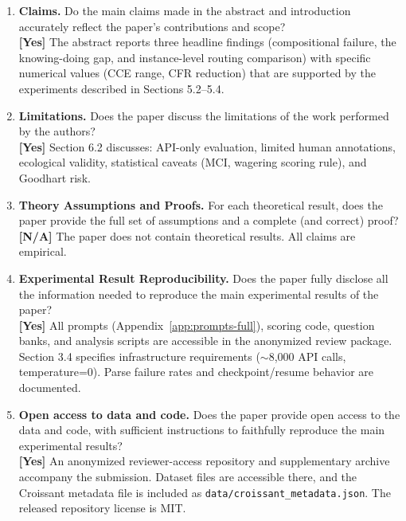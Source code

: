\documentclass[10pt]{article}
\begin{document}
\begin{enumerate}

\item \textbf{Claims.} Do the main claims made in the abstract and introduction accurately reflect the paper's contributions and scope?
\\\textbf{[Yes]} The abstract reports three headline findings (compositional failure, the knowing-doing gap, and instance-level routing comparison) with specific numerical values (CCE range, CFR reduction) that are supported by the experiments described in Sections 5.2--5.4.

\item \textbf{Limitations.} Does the paper discuss the limitations of the work performed by the authors?
\\\textbf{[Yes]} Section 6.2 discusses: API-only evaluation, limited human annotations, ecological validity, statistical caveats (MCI, wagering scoring rule), and Goodhart risk.

\item \textbf{Theory Assumptions and Proofs.} For each theoretical result, does the paper provide the full set of assumptions and a complete (and correct) proof?
\\\textbf{[N/A]} The paper does not contain theoretical results. All claims are empirical.

\item \textbf{Experimental Result Reproducibility.} Does the paper fully disclose all the information needed to reproduce the main experimental results of the paper?
\\\textbf{[Yes]} All prompts (Appendix~\ref{app:prompts-full}), scoring code, question banks, and analysis scripts are accessible in the anonymized review package. Section 3.4 specifies infrastructure requirements ($\sim$8{,}000 API calls, temperature=0). Parse failure rates and checkpoint/resume behavior are documented.

\item \textbf{Open access to data and code.} Does the paper provide open access to the data and code, with sufficient instructions to faithfully reproduce the main experimental results?
\\\textbf{[Yes]} An anonymized reviewer-access repository and supplementary archive accompany the submission. Dataset files are accessible there, and the Croissant metadata file is included as \texttt{data/croissant\_metadata.json}. The released repository license is MIT.


\end{enumerate}
\end{document}
